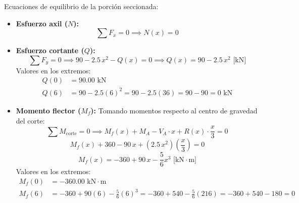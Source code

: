 Ecuaciones de equilibrio de la porción seccionada:
\begin{itemize}
    \item \textbf{Esfuerzo axil ($N$):}
          \begin{equation}
              \sum F_x = 0 \implies \boxed{N(x) = 0}
          \end{equation}

    \item \textbf{Esfuerzo cortante ($Q$):}
          \begin{equation}
              \sum F_y = 0 \implies 90 - 2.5\,x^2 - Q(x) = 0 \implies \boxed{Q(x) = 90 - 2.5\,x^2\text{ [kN]}}
          \end{equation}
          Valores en los extremos:
          \begin{align*}
              Q(0) & = 90.00\text{ kN}                                      \\
              Q(6) & = 90 - 2.5(6)^2 = 90 - 2.5(36) = 90 - 90 = 0\text{ kN}
          \end{align*}

    \item \textbf{Momento flector ($M_f$):}
          Tomando momentos respecto al centro de gravedad del corte:
          \begin{equation}
              \sum M_{\text{corte}} = 0 \implies M_f(x) + M_A - V_A \cdot x + R(x) \cdot \frac{x}{3} = 0
          \end{equation}
          \begin{equation}
              M_f(x) + 360 - 90\,x + (2.5\,x^2)\left(\frac{x}{3}\right) = 0
          \end{equation}
          \begin{equation}
              \boxed{M_f(x) = -360 + 90\,x - \frac{5}{6}x^3\text{ [kN}\cdot\text{m]}}
          \end{equation}
          Valores en los extremos:
          \begin{align*}
              M_f(0) & = -360.00\text{ kN}\cdot\text{m}                                                         \\
              M_f(6) & = -360 + 90(6) - \frac{5}{6}(6)^3 = -360 + 540 - \frac{5}{6}(216) = -360 + 540 - 180 = 0
          \end{align*}
\end{itemize}

